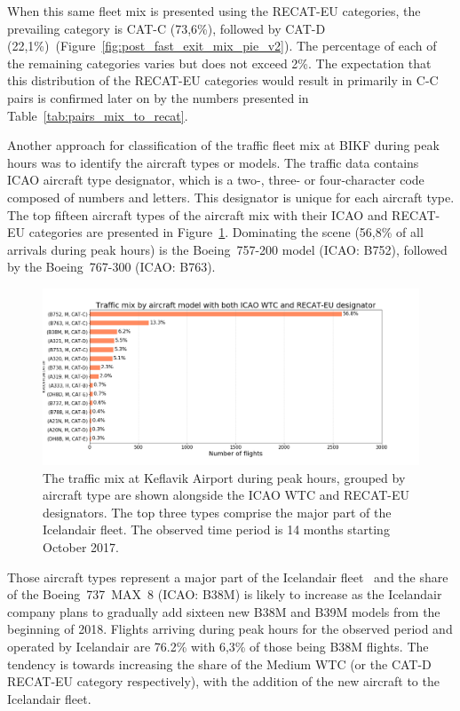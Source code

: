 When this same fleet mix is presented using the RECAT-EU categories, the prevailing category is CAT-C (73,6\%), followed by CAT-D (22,1\%)~(Figure~\ref{fig:post_fast_exit_mix_pie_v2}). The percentage of each of the remaining categories varies but does not exceed 2\%. The expectation that this distribution of the RECAT-EU categories would result in primarily in C-C pairs is confirmed later on by the numbers presented in Table~\ref{tab:pairs_mix_to_recat}. 

Another approach for classification of the traffic fleet mix at BIKF during peak hours was to identify the aircraft types or models. The traffic data contains ICAO aircraft type designator, which is a two-, three- or four-character code composed of numbers and letters. This designator is unique for each aircraft type. The top fifteen aircraft types of the aircraft mix with their ICAO and RECAT-EU categories are presented in Figure~\ref{fig:traffic_mix_by_model}. Dominating the scene (56,8\% of all arrivals during peak hours) is the Boeing~757-200 model (ICAO: B752), followed by the Boeing~767-300 (ICAO: B763).

\begin{figure}[h]
    \centering
    \includegraphics[width=1\textwidth]{graphics/fig_traffic_mix_by_model.png}
    \caption[Traffic mix by aircraft type.]{The traffic mix at Keflavik Airport during peak hours, grouped by aircraft type are shown alongside the ICAO WTC and RECAT-EU designators. The top three types comprise the major part of the Icelandair fleet. The observed time period is 14 months starting October 2017.}
    \label{fig:traffic_mix_by_model}
\end{figure}

 Those aircraft types represent a major part of the Icelandair fleet~\cite{icelandair_fleet} and the share of the Boeing~737~MAX~8 (ICAO: B38M) is likely to increase as the Icelandair company plans to gradually add sixteen new B38M and B39M models from the beginning of 2018. Flights arriving during peak hours for the observed period and operated by Icelandair are 76.2\% with 6,3\% of those being B38M flights. The tendency is towards increasing the share of the Medium WTC (or the CAT-D RECAT-EU category respectively), with the addition of the new aircraft to the Icelandair fleet.

